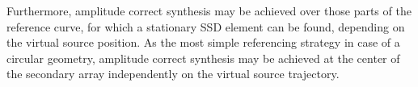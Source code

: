 Furthermore, amplitude correct synthesis may be achieved over those parts of the reference curve, for which a stationary SSD element can be found, depending on the virtual source position.
As the most simple referencing strategy in case of a circular geometry, amplitude correct synthesis may be achieved at the center of the secondary array independently on the virtual source trajectory.


